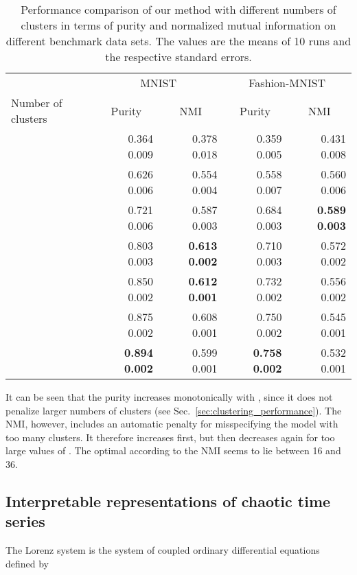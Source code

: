 \documentclass{article}
\begin{document}
\begin{table}
    \centering
    \caption{Performance comparison of our method with different numbers of clusters in terms of purity and normalized mutual information on different benchmark data sets. The values are the means of 10 runs and the respective standard errors.}
    \begin{tabular}{lrrrr}
        \toprule
         & \multicolumn{2}{c}{MNIST} & \multicolumn{2}{c}{Fashion-MNIST} \\
        \cmidrule(rl){2-3}
        \cmidrule(rl){4-5}
        Number of clusters & \multicolumn{1}{c}{Purity} & \multicolumn{1}{c}{NMI} & \multicolumn{1}{c}{Purity} & \multicolumn{1}{c}{NMI} \\
         \midrule
          & 0.364  0.009 & 0.378  0.018 & 0.359  0.005 & 0.431  0.008\\
          & 0.626  0.006 & 0.554  0.004 & 0.558  0.007 & 0.560  0.006\\
          & 0.721  0.006 & 0.587  0.003 & 0.684  0.003 & \textbf{0.589  0.003}\\
          & 0.803  0.003 & \textbf{0.613  0.002} & 0.710  0.003 & 0.572  0.002\\
          & 0.850  0.002 & \textbf{0.612  0.001} & 0.732  0.002 & 0.556  0.002\\
          & 0.875  0.002 & 0.608  0.001 & 0.750  0.002 & 0.545  0.001\\
          & \textbf{0.894  0.002} & 0.599  0.001 & \textbf{0.758  0.002} & 0.532  0.001\\
         \bottomrule
    \end{tabular}
    \label{tab:k_performance}
\end{table}

It can be seen that the purity increases monotonically with , since it does not penalize larger numbers of clusters (see Sec.~\ref{sec:clustering_performance}).
The NMI, however, includes an automatic penalty for misspecifying the model with too many clusters.
It therefore increases first, but then decreases again for too large values of .
The optimal  according to the NMI seems to lie between 16 and 36.


\subsection{Interpretable representations of chaotic time series}\label{sec:lorenz_appendix}

The Lorenz system is the system of coupled ordinary differential equations defined by
\end{document}
